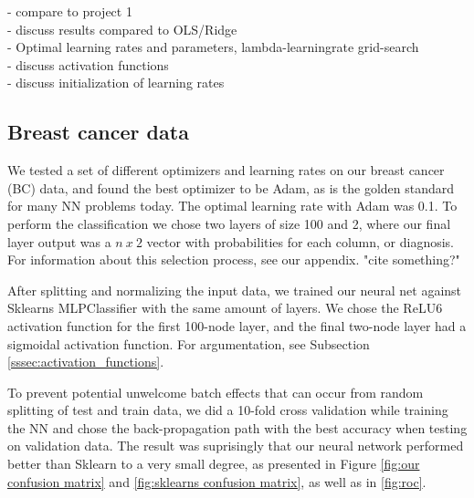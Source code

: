 - compare to project 1\\
- discuss results compared to OLS/Ridge\\
- Optimal learning rates and parameters, lambda-learningrate grid-search\\
- discuss activation functions\\
- discuss initialization of learning rates\\


\subsection{Breast cancer data}
We tested a set of different optimizers and learning rates on our breast cancer (BC) data, and found the best optimizer to be Adam, as is the golden standard for many NN problems today. The optimal learning rate with Adam was 0.1. To perform the classification we chose two layers of size 100 and 2, where our final layer output was a $n\ x\ 2$ vector with probabilities for each column, or diagnosis. For information about this selection process, see our appendix. "cite something?"

After splitting and normalizing the input data, we trained our neural net against Sklearns MLPClassifier with the same amount of layers. We chose the ReLU6 activation function for the first 100-node layer, and the final two-node layer had a sigmoidal activation function. For argumentation, see Subsection \ref{sssec:activation_functions}.

To prevent potential unwelcome batch effects that can occur from random splitting of test and train data, we did a 10-fold cross validation while training the NN and chose the back-propagation path with the best accuracy when testing on validation data. The result was suprisingly that our neural network performed better than Sklearn to a very small degree, as presented in Figure \ref{fig:our confusion matrix} and \ref{fig:sklearns confusion matrix}, as well as in \ref{fig:roc}.

